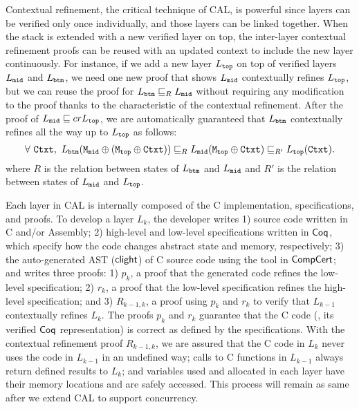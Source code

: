 Contextual refinement, the critical technique of CAL, is powerful since layers can be verified only once individually, and those layers can be linked together.
 When the stack is extended with a new verified layer on top, 
 the inter-layer contextual refinement proofs can be reused with an updated context to include the new layer continuously. 
For instance, if we add a new layer $L_{{\mathrm{\texttt{top}}}}$ on top of verified layers $L_{{\mathrm{\texttt{mid}}}}$ and $L_{{\mathrm{\texttt{btm}}}}$, 
we need one new proof that shows $L_{{\mathrm{\texttt{mid}}}}$ contextually refines $L_{{\mathrm{\texttt{top}}}}$, but we can reuse the proof for $L_{{\mathrm{\texttt{btm}}}} \sqsubseteq_{R} L_{{\mathrm{\texttt{mid}}}}$ without requiring any modification to the proof thanks to the characteristic of the contextual refinement. After the proof of $L_{{\mathrm{\texttt{mid}}}} \sqsubseteq{cr} L_{{\mathrm{\texttt{top}}}}$, we are automatically guaranteed that $L_{{\mathrm{\texttt{btm}}}}$ contextually refines all the way up to $L_{{\mathrm{\texttt{top}}}}$ as follows:
$$
\forall\ {\mathrm{\texttt{Ctxt}}},\ L_{{\mathrm{\texttt{btm}}}} ({\mathrm{\texttt{M}}}_{{\mathrm{\texttt{mid}}}}\oplus ({\mathrm{\texttt{M}}}_{{\mathrm{\texttt{top}}}}\oplus {\mathrm{\texttt{Ctxt}}})) \sqsubseteq_{R}  L_{{\mathrm{\texttt{mid}}}} ({\mathrm{\texttt{M}}}_{{\mathrm{\texttt{top}}}} \oplus {\mathrm{\texttt{Ctxt}}}) \sqsubseteq_{R'} L_{{\mathrm{\texttt{top}}}} ({\mathrm{\texttt{Ctxt}}}). 
$$ 
where $R$ is the relation between states of $ L_{{\mathrm{\texttt{btm}}}}$ and $L_{{\mathrm{\texttt{mid}}}}$ and $R'$ is the relation between states of 
 $ L_{{\mathrm{\texttt{mid}}}}$ and $L_{{\mathrm{\texttt{top}}}}$.


Each layer in CAL is internally composed of the C implementation, specifications, and proofs.
To develop a layer $L_k$, 
the developer writes 
1) source code written in C and/or Assembly; 
2) high-level and  low-level specifications written in $\mathsf{Coq}$, which specify how the code changes abstract state and memory, respectively; 
3) the auto-generated AST ($\mathsf{clight}$) of C source code using the tool in $\mathsf{CompCert}$; 
and writes three proofs: 
1) $p_k$, a proof that the generated code refines the low-level specification; 
2) $r_k$, a proof that the low-level specification refines the high-level specification; and 
3) $R_{k-1,k}$, a proof using $p_k$ and $r_k$ to verify that $L_{k-1}$ contextually refines $L_{k}$. 
The proofs $p_k$ and $r_k$ guarantee that the C code (\ie , its verified $\mathsf{Coq}$ representation) is correct as defined by the specifications.
 With the contextual refinement proof $R_{k-1, k}$, we are assured that the C code in $L_k$ never uses the code in $L_{k-1}$ in an undefined way; 
 calls to C functions in $L_{k-1}$ always return defined results to $L_k$; and variables 
 used and allocated in each layer have their memory locations and are safely accessed.
 This process will remain as same after we extend CAL to support concurrency.

